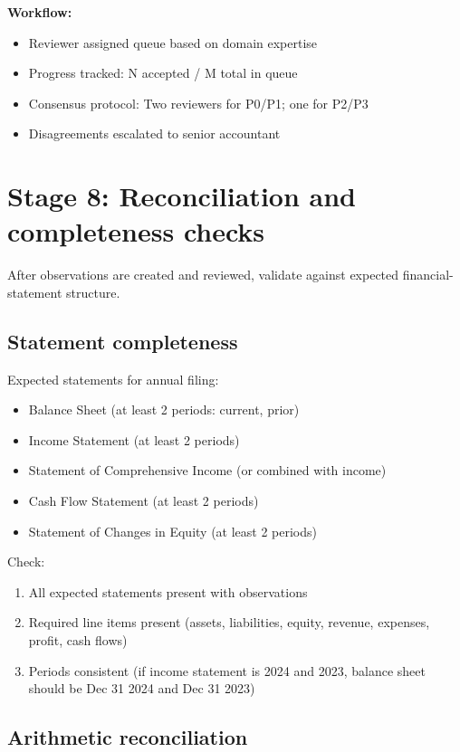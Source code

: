 \textbf{Workflow:}
\begin{itemize}
\item Reviewer assigned queue based on domain expertise
\item Progress tracked: N accepted / M total in queue
\item Consensus protocol: Two reviewers for P0/P1; one for P2/P3
\item Disagreements escalated to senior accountant
\end{itemize}

\section{Stage 8: Reconciliation and completeness checks}

After observations are created and reviewed, validate against expected financial-statement structure.

\subsection{Statement completeness}

Expected statements for annual filing:
\begin{itemize}
\item Balance Sheet (at least 2 periods: current, prior)
\item Income Statement (at least 2 periods)
\item Statement of Comprehensive Income (or combined with income)
\item Cash Flow Statement (at least 2 periods)
\item Statement of Changes in Equity (at least 2 periods)
\end{itemize}

Check:
\begin{enumerate}
\item All expected statements present with observations
\item Required line items present (assets, liabilities, equity, revenue, expenses,
  profit, cash flows)
\item Periods consistent (if income statement is 2024 and 2023, balance sheet
  should be Dec 31 2024 and Dec 31 2023)
\end{enumerate}

\subsection{Arithmetic reconciliation}

